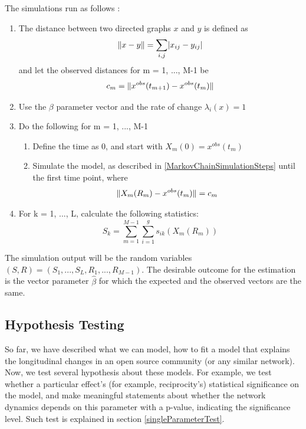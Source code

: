 \documentclass[11pt]{report}
\DeclarePairedDelimiter{\abs}{\lvert}{\rvert}
\DeclarePairedDelimiter{\norm}{\lVert}{\rVert}
\begin{document}
The simulations run as follows \cite{Snijders2004}:
\begin{enumerate}
\item The distance between two directed graphs $x$ and $y$ is defined as
\begin{equation}
\norm{x -y} = \sum_{i,j}\abs{x_{ij} - y_{ij}}
\end{equation}
and let the observed distances for m = 1, ..., M-1 be 
\begin{equation}
c_m = \norm{x^{obs}(t_{m+1})-x^{obs}(t_m)}
\end{equation}
\item Use the $\beta$ parameter vector and the rate of change $\lambda_{i}(x) = 1$

\item Do the following for m = 1, ..., M-1
\begin{enumerate}
\item Define the time as 0, and start with $X_m(0) = x^{obs}(t_m)$
\item Simulate the model, as described in \ref{MarkovChainSimulationSteps} until the first time point, where 
\begin{equation}
\norm{X_m(R_m) - x^{obs}(t_m)} = c_m
\end{equation}
\end{enumerate}
\item For k = 1, ..., L, calculate the following statistics:
\begin{equation}
S_k = \sum_{m = 1}^{M-1}\sum_{i=1}^{g}s_{ik}(X_m(R_m))
\end{equation}
\end{enumerate}

The simulation output will be the random variables $(S,R) = (S_1,...,S_L,R_1,...,R_{M-1})$. The desirable outcome for the estimation is the vector parameter $\hat{\beta}$ for which the expected and the observed vectors are the same. 

\subsection{Hypothesis Testing}
So far, we have described what we can model, how to fit a model that explains the longitudinal changes in an open source community (or any similar network). Now, we test several hypothesis about these models. For example, we test whether a particular effect's (for example, reciprocity's) statistical significance on the model, and make meaningful statements about whether the network dynamics depends on this parameter with a p-value, indicating the significance level. Such test is explained in section \ref{singleParameterTest}.
\end{document}
